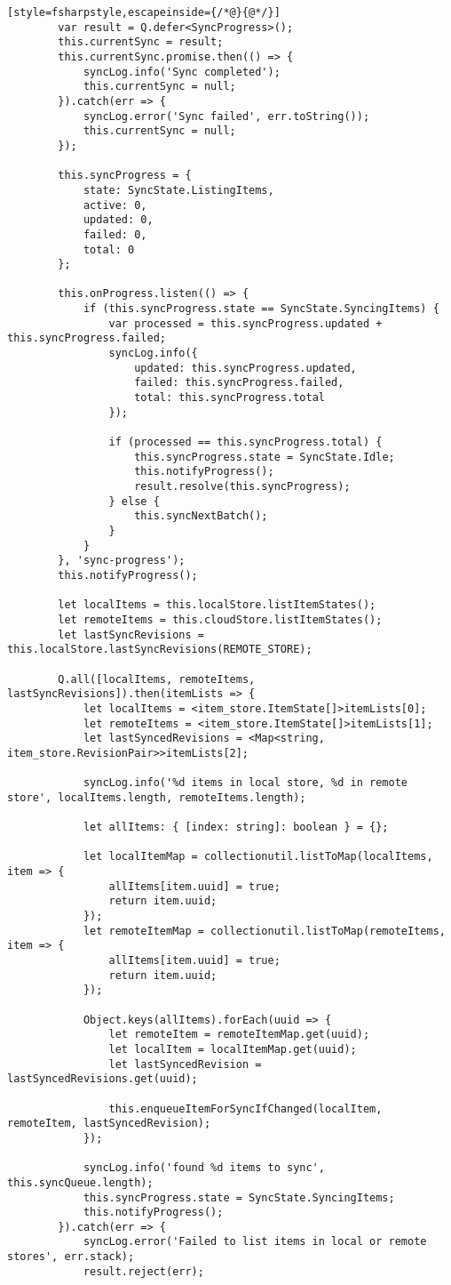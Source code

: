 \begin{lstlisting}[style=fsharpstyle,escapeinside={/*@}{@*/}]
		var result = Q.defer<SyncProgress>();
		this.currentSync = result;
		this.currentSync.promise.then(() => {
			syncLog.info('Sync completed');
			this.currentSync = null;
		}).catch(err => {
			syncLog.error('Sync failed', err.toString());
			this.currentSync = null;
		});

		this.syncProgress = {
			state: SyncState.ListingItems,
			active: 0,
			updated: 0,
			failed: 0,
			total: 0
		};

		this.onProgress.listen(() => {
			if (this.syncProgress.state == SyncState.SyncingItems) {
				var processed = this.syncProgress.updated + this.syncProgress.failed;
				syncLog.info({
					updated: this.syncProgress.updated,
					failed: this.syncProgress.failed,
					total: this.syncProgress.total
				});

				if (processed == this.syncProgress.total) {
					this.syncProgress.state = SyncState.Idle;
					this.notifyProgress();
					result.resolve(this.syncProgress);
				} else {
					this.syncNextBatch();
				}
			}
		}, 'sync-progress');
		this.notifyProgress();

		let localItems = this.localStore.listItemStates();
		let remoteItems = this.cloudStore.listItemStates();
		let lastSyncRevisions = this.localStore.lastSyncRevisions(REMOTE_STORE);

		Q.all([localItems, remoteItems, lastSyncRevisions]).then(itemLists => {
			let localItems = <item_store.ItemState[]>itemLists[0];
			let remoteItems = <item_store.ItemState[]>itemLists[1];
			let lastSyncedRevisions = <Map<string, item_store.RevisionPair>>itemLists[2];

			syncLog.info('%d items in local store, %d in remote store', localItems.length, remoteItems.length);

			let allItems: { [index: string]: boolean } = {};

			let localItemMap = collectionutil.listToMap(localItems, item => {
				allItems[item.uuid] = true;
				return item.uuid;
			});
			let remoteItemMap = collectionutil.listToMap(remoteItems, item => {
				allItems[item.uuid] = true;
				return item.uuid;
			});

			Object.keys(allItems).forEach(uuid => {
				let remoteItem = remoteItemMap.get(uuid);
				let localItem = localItemMap.get(uuid);
				let lastSyncedRevision = lastSyncedRevisions.get(uuid);

				this.enqueueItemForSyncIfChanged(localItem, remoteItem, lastSyncedRevision);
			});

			syncLog.info('found %d items to sync', this.syncQueue.length);
			this.syncProgress.state = SyncState.SyncingItems;
			this.notifyProgress();
		}).catch(err => {
			syncLog.error('Failed to list items in local or remote stores', err.stack);
			result.reject(err);


\end{lstlisting}

